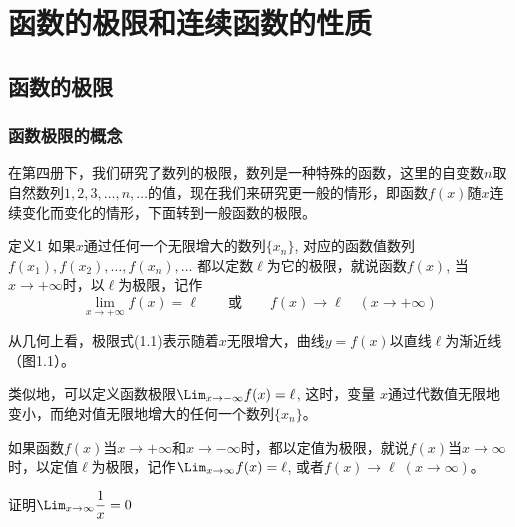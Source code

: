 \chapter{函数的极限和连续函数的性质}

\section{函数的极限}
\subsection{函数极限的概念}

在第四册下，我们研究了数列的极限，数列是一种特殊的函数，这里的自变数$n$取自然数列$1, 2, 3,\ldots,n,\ldots$的值，现在我们来研究更一般的情形，即函数$f(x)$随$x$连续变化而变化的情形，下面转到一般函数的极限。

\begin{blk}{定义1}
    如果$x$通过任何一个无限增大的数列$\{x_n\}$, 对应的函数值数列
$f (x_1 ) ,f (x_2) , \ldots,f (x_n ) ,\ldots$
都以定数$\ell$为它的极限，就说函数$f(x)$, 当$x\to +\infty$时，以$\ell$为极限，记作
\begin{equation}
    \lim_{x\to+\infty}f(x)=\ell\qquad \text{或}\qquad f(x)\to \ell\quad (x\to +\infty)
\end{equation}
\end{blk}
 
从几何上看，极限式(1.1)表示随着$x$无限增大，曲线$y=f(x)$以直线$\ell$为渐近线（图1.1）。
\begin{figure}[htp]
    \centering
{}
    \caption{}
\end{figure}

类似地，可以定义函数极限$\Lim_{x\to -\infty} f(x)=\ell$, 这时，变量
$x$通过代数值无限地变小，而绝对值无限地增大的任何一个数列$\{x_n\}$。

如果函数$f(x)$当$x\to+\infty$和$x\to-\infty$时，都以定值为极限，就说$f(x)$当$x\to \infty$时，以定值$\ell$为极限，记作$\Lim_{x\to\infty}f(x)=\ell$, 或者$f(x)\to \ell\; (x\to\infty)$。

\begin{example}
    证明$\Lim_{x\to\infty}\frac{1}{x}=0$
\end{example}

